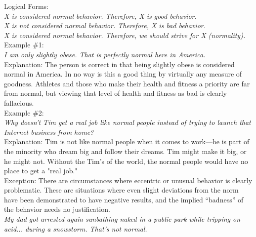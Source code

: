 \documentclass[a4paper,12pt,single,pdftex]{scrartcl}
\begin{document}
    
      Logical Forms:
    \\

    
      {\em X is considered normal behavior. \newline
Therefore, X is good behavior.}
    \\

    
      {\em X is not considered normal behavior. \newline
Therefore, X is bad behavior.}
    \\

    
      {\em X is considered normal behavior. \newline
Therefore, we should strive for X (normality).}
    \\

    
      Example \#1:
    \\

    
      {\em I am only slightly obese.  That is perfectly normal here in America.}
    \\

    
      Explanation:  The person is correct in that being slightly obese is considered normal in America.  In no way is this a good thing by virtually any measure of goodness.  Athletes and those who make their health and fitness a priority are far from normal, but viewing that level of health and fitness as bad is clearly fallacious.
    \\

    
      Example \#2:
    \\

    
      {\em Why doesn't Tim get a real job like normal people instead of trying to launch that Internet business from home?}
    \\

    
      Explanation:  Tim is not like normal people when it comes to work—he is part of the minority who dream big and follow their dreams.  Tim might make it big, or he might not.  Without the Tim's of the world, the normal people would have no place to get a "real job."
    \\

    
      Exception: There are circumstances where eccentric or unusual behavior is clearly problematic. These are situations where even slight deviations from the norm have been demonstrated to have negative results, and the implied “badness” of the behavior needs no justification.
    \\

    
      {\em My dad got arrested again sunbathing naked in a public park while tripping on acid... during a snowstorm. That’s not normal.}
    \\
\end{document}
